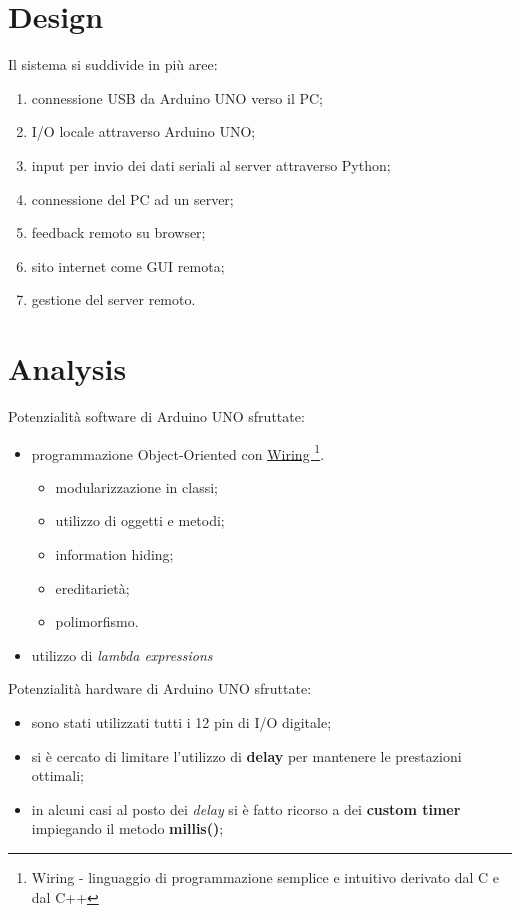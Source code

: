 \section{Design}
Il sistema si suddivide in più aree:
\begin{enumerate}
	\item connessione USB da Arduino UNO verso il PC;
	\item I/O locale attraverso Arduino UNO;
	\item input per invio dei dati seriali al server attraverso Python;
	\item connessione del PC ad un server;
	\item feedback remoto su browser;
	\item sito internet come GUI remota;
	\item gestione del server remoto.
\end{enumerate}

\section{Analysis}
Potenzialità software di Arduino UNO sfruttate:
\begin{itemize}
	\item programmazione Object-Oriented con \href{https://it.wikipedia.org/wiki/Wiring}{Wiring \footnote{Wiring - linguaggio di programmazione semplice e intuitivo derivato dal C e dal C++}}.
	\begin{itemize}
		\item modularizzazione in classi;
		\item utilizzo di oggetti e metodi;
		\item information hiding;
		\item ereditarietà;
		\item polimorfismo.
	\end{itemize}
	\item utilizzo di \textit{lambda expressions}
\end{itemize}
Potenzialità hardware di Arduino UNO sfruttate:
\begin{itemize}
	\item sono stati utilizzati tutti i 12 pin di I/O digitale;
	\item si è cercato di limitare l'utilizzo di \textbf{delay} per mantenere le prestazioni ottimali;
	\item in alcuni casi al posto dei \textit{delay} si è fatto ricorso a dei \textbf{custom timer} impiegando il metodo \textbf{millis()};
\end{itemize}